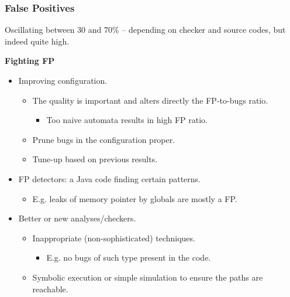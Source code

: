 \documentclass[xcolor=dvipsnames]{beamer}
\newcommand{\heading}[1]{\textbf{\textcolor{BurntOrange}{#1}}}
\begin{document}
\begin{frame}[fragile]
  \frametitle{False Positives}
  Oscillating between 30 and 70\% -- depending on checker and source codes,
  but indeed quite high.

  \medskip
  \pause

  \heading {Fighting FP}
  \begin{itemize}
  \item Improving configuration.
  \begin{itemize}
    \item The quality is important and alters directly the FP-to-bugs ratio.
      \begin{itemize}
      \item Too naive automata results in high FP ratio.
      \end{itemize}
    \item Prune bugs in the configuration proper.
    \item Tune-up based on previous results.
  \end{itemize}
\pause
  \item FP detectors: a Java code finding certain patterns.
  \begin{itemize}
    \item E.g. leaks of memory pointer by globals are mostly a FP.
  \end{itemize}
\pause
  \item Better or new analyses/checkers.
  \begin{itemize}
    \item Inappropriate (non-sophisticated) techniques.
      \begin{itemize}
      \item E.g. no bugs of such type present in the code.
      \end{itemize}
    \item Symbolic execution or simple simulation to ensure the
      paths are reachable.
  \end{itemize}
  \end{itemize}

\end{frame}
\end{document}
